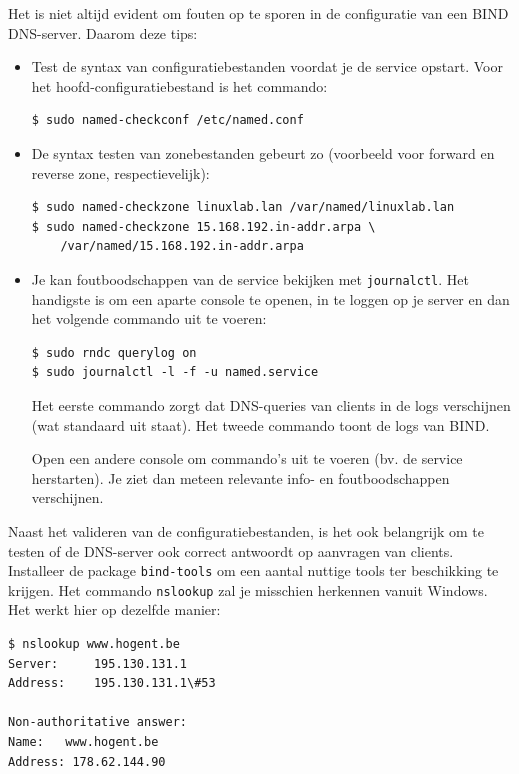 Het is niet altijd evident om fouten op te sporen in de configuratie van een BIND DNS-server. Daarom deze tips:

\begin{itemize}
  \item Test de syntax van configuratiebestanden voordat je de service opstart. Voor het hoofd-configuratiebestand  is het commando:
    \begin{verbatim}
$ sudo named-checkconf /etc/named.conf
    \end{verbatim}
  \item De syntax testen van zonebestanden gebeurt zo (voorbeeld voor forward en reverse zone, respectievelijk):

    \begin{verbatim}
$ sudo named-checkzone linuxlab.lan /var/named/linuxlab.lan
$ sudo named-checkzone 15.168.192.in-addr.arpa \
    /var/named/15.168.192.in-addr.arpa
    \end{verbatim}

\item Je kan foutboodschappen van de service bekijken met \texttt{journalctl}. Het handigste is om een aparte console te openen, in te loggen op je server en dan het volgende commando uit te voeren:

    \begin{verbatim}
$ sudo rndc querylog on
$ sudo journalctl -l -f -u named.service
    \end{verbatim}

  Het eerste commando zorgt dat DNS-queries van clients in de logs verschijnen (wat standaard uit staat). Het tweede commando toont de logs van BIND.

  Open een andere console om commando's uit te voeren (bv. de service herstarten). Je ziet dan meteen relevante info- en foutboodschappen verschijnen.
\end{itemize}

Naast het valideren van de configuratiebestanden, is het ook belangrijk om te testen of de DNS-server ook correct antwoordt op aanvragen van clients. Installeer de package \texttt{bind-tools} om een aantal nuttige tools ter beschikking te krijgen. Het commando \texttt{nslookup} zal je misschien herkennen vanuit Windows. Het werkt hier op dezelfde manier:

\begin{verbatim}
$ nslookup www.hogent.be
Server:		195.130.131.1
Address:	195.130.131.1\#53

Non-authoritative answer:
Name:	www.hogent.be
Address: 178.62.144.90
\end{verbatim}

